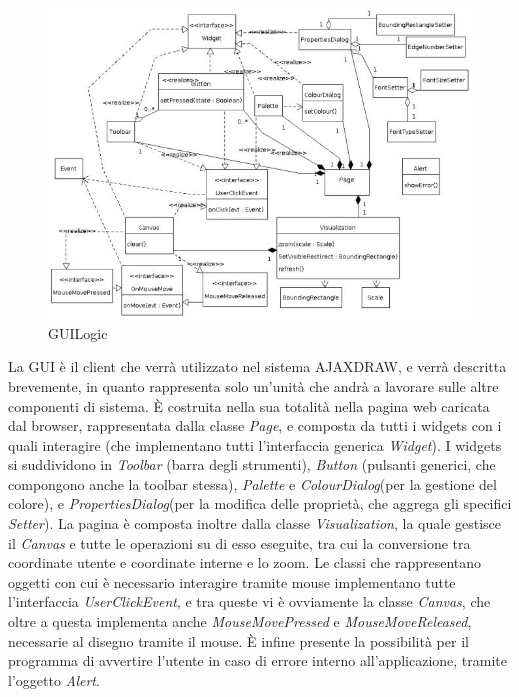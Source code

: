 \begin{figure}[!ht]
\centering
\includegraphics{GUIlogic.jpg}
\caption{GUILogic}
\end{figure}
La GUI \` e  il client che verr\` a utilizzato nel sistema AJAXDRAW, e verr\` a descritta brevemente, in quanto rappresenta solo un'unit\` a che andr\`  a a lavorare sulle altre componenti di sistema. \` E costruita nella sua totalit\` a nella pagina web caricata dal browser, rappresentata dalla classe \textit{Page}, e composta da tutti i widgets con i quali interagire (che implementano tutti l'interfaccia generica \textit{Widget}).  I widgets si suddividono in \textit{Toolbar} (barra degli strumenti), \textit{Button} (pulsanti generici, che compongono anche la toolbar stessa), \textit{Palette} e \textit{ColourDialog}(per la gestione del colore), e \textit{PropertiesDialog}(per la modifica delle propriet\` a, che aggrega gli specifici \textit{Setter}). La pagina \` e composta inoltre dalla classe \textit{Visualization}, la quale gestisce il \textit{Canvas} e tutte le operazioni su di esso eseguite, tra cui la conversione tra coordinate utente e coordinate interne e lo zoom. Le classi che rappresentano oggetti con cui \`e necessario interagire tramite mouse implementano tutte l'interfaccia \textit{UserClickEvent}, e tra queste vi \` e ovviamente la classe \textit{Canvas}, che oltre a questa implementa anche \textit{MouseMovePressed} e \textit{MouseMoveReleased}, necessarie al disegno tramite il mouse.  \` E infine presente la possibilit\` a per il programma di avvertire l'utente in caso di errore interno all'applicazione, tramite l'oggetto \textit{Alert}.
\newpage
{}

